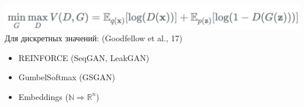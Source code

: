 \documentclass[10pt]{beamer}
\begin{document}
\begin{frame}
\begin{columns}
\begin{column}{0.65\textwidth}
\begin{center}
            \includegraphics[width=\textwidth]{images/gan_loss.png}\\
            \vskip2mm
            Для дискретных значений: (Goodfellow et al., 17)
            \begin{itemize}
                \item REINFORCE (SeqGAN, LeakGAN)
                \item GumbelSoftmax (GSGAN)
                \item Embeddings ($\mathbb{N} \Rightarrow \mathbb{R}^n$)
            \end{itemize}
        \end{center}
    \end{column}
\end{columns}

\end{frame}
\end{document}
